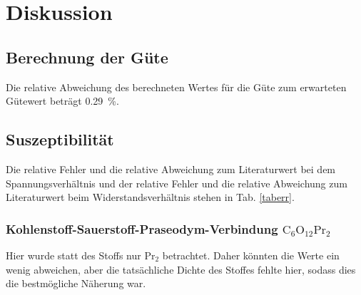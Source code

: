 \section{Diskussion}
\label{sec:Diskussion}

\subsection{Berechnung der Güte}
Die relative Abweichung des berechneten Wertes für die Güte zum erwarteten Gütewert beträgt \SI{0.29}{\percent}. 

\subsection{Suszeptibilität}

Die relative Fehler und die relative Abweichung zum Literaturwert bei dem Spannungsverhältnis und der relative Fehler und die relative Abweichung zum Literaturwert beim Widerstandsverhältnis stehen in Tab. \ref{taberr}. 


\subsubsection{Kohlenstoff-Sauerstoff-Praseodym-Verbindung $\text{C}_6 \text{O}_{12} \text{Pr}_2$}
Hier wurde statt des Stoffs nur $\text{Pr}_2$ betrachtet. Daher könnten die Werte ein wenig abweichen, aber die tatsächliche Dichte des Stoffes fehlte hier, sodass dies die bestmögliche Näherung war.


